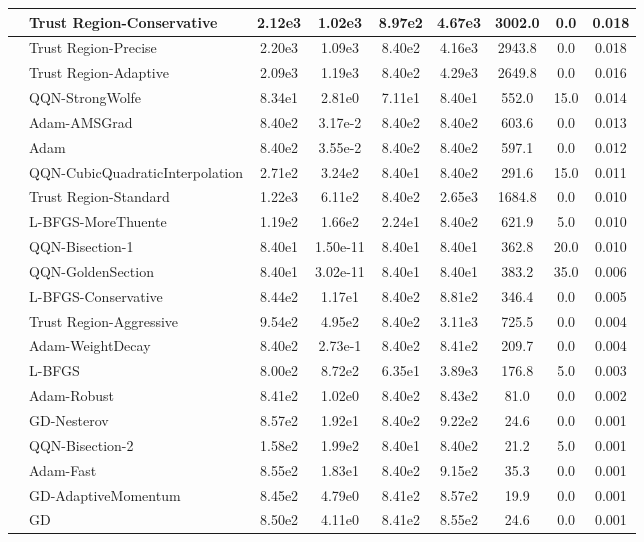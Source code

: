 \documentclass[10pt]{article}
\begin{document}
\begin{longtable}{|l|l|c|c|c|c|c|c|c|}
\hline
 & Trust Region-Conservative & 2.12e3 & 1.02e3 & 8.97e2 & 4.67e3 & 3002.0 & 0.0 & 0.018 \\
\hline
 & Trust Region-Precise & 2.20e3 & 1.09e3 & 8.40e2 & 4.16e3 & 2943.8 & 0.0 & 0.018 \\
\hline
 & Trust Region-Adaptive & 2.09e3 & 1.19e3 & 8.40e2 & 4.29e3 & 2649.8 & 0.0 & 0.016 \\
\hline
 & QQN-StrongWolfe & 8.34e1 & 2.81e0 & 7.11e1 & 8.40e1 & 552.0 & 15.0 & 0.014 \\
\hline
 & Adam-AMSGrad & 8.40e2 & 3.17e-2 & 8.40e2 & 8.40e2 & 603.6 & 0.0 & 0.013 \\
\hline
 & Adam & 8.40e2 & 3.55e-2 & 8.40e2 & 8.40e2 & 597.1 & 0.0 & 0.012 \\
\hline
 & QQN-CubicQuadraticInterpolation & 2.71e2 & 3.24e2 & 8.40e1 & 8.40e2 & 291.6 & 15.0 & 0.011 \\
\hline
 & Trust Region-Standard & 1.22e3 & 6.11e2 & 8.40e2 & 2.65e3 & 1684.8 & 0.0 & 0.010 \\
\hline
 & L-BFGS-MoreThuente & 1.19e2 & 1.66e2 & 2.24e1 & 8.40e2 & 621.9 & 5.0 & 0.010 \\
\hline
 & QQN-Bisection-1 & 8.40e1 & 1.50e-11 & 8.40e1 & 8.40e1 & 362.8 & 20.0 & 0.010 \\
\hline
 & QQN-GoldenSection & 8.40e1 & 3.02e-11 & 8.40e1 & 8.40e1 & 383.2 & 35.0 & 0.006 \\
\hline
 & L-BFGS-Conservative & 8.44e2 & 1.17e1 & 8.40e2 & 8.81e2 & 346.4 & 0.0 & 0.005 \\
\hline
 & Trust Region-Aggressive & 9.54e2 & 4.95e2 & 8.40e2 & 3.11e3 & 725.5 & 0.0 & 0.004 \\
\hline
 & Adam-WeightDecay & 8.40e2 & 2.73e-1 & 8.40e2 & 8.41e2 & 209.7 & 0.0 & 0.004 \\
\hline
 & L-BFGS & 8.00e2 & 8.72e2 & 6.35e1 & 3.89e3 & 176.8 & 5.0 & 0.003 \\
\hline
 & Adam-Robust & 8.41e2 & 1.02e0 & 8.40e2 & 8.43e2 & 81.0 & 0.0 & 0.002 \\
\hline
 & GD-Nesterov & 8.57e2 & 1.92e1 & 8.40e2 & 9.22e2 & 24.6 & 0.0 & 0.001 \\
\hline
 & QQN-Bisection-2 & 1.58e2 & 1.99e2 & 8.40e1 & 8.40e2 & 21.2 & 5.0 & 0.001 \\
\hline
 & Adam-Fast & 8.55e2 & 1.83e1 & 8.40e2 & 9.15e2 & 35.3 & 0.0 & 0.001 \\
\hline
 & GD-AdaptiveMomentum & 8.45e2 & 4.79e0 & 8.41e2 & 8.57e2 & 19.9 & 0.0 & 0.001 \\
\hline
 & GD & 8.50e2 & 4.11e0 & 8.41e2 & 8.55e2 & 24.6 & 0.0 & 0.001 \\

\end{longtable}
\end{document}
